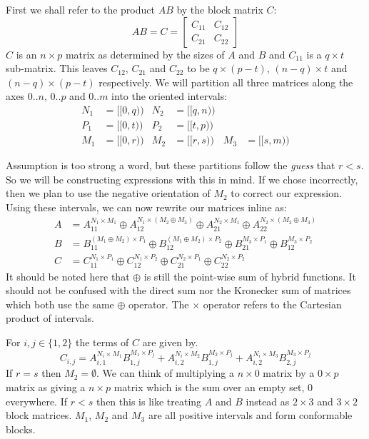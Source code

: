First we shall refer to the product $AB$ by the block matrix $C$:
\begin{equation}
	AB = C = \begin{bmatrix} C_{11} & C_{12} \\ C_{21} & C_{22} \end{bmatrix}
\end{equation}
$C$ is an $n \times p$ matrix as determined by the sizes of $A$ and $B$ and $C_{11}$ is a $q \times t$ sub-matrix.
This leaves $C_{12}$, $C_{21}$ and $C_{22}$ to be $q \times (p-t)$, $(n-q) \times t$ and $(n-q) \times (p-t)$ respectively.
We will partition all three matrices along the axes $0.. n$, $0..p$ and $0..m$ into the oriented intervals:
\begin{align*}
	N_1 	&= [\![0, q)\!) 	& N_2 	&= [\![q, n)\!) 	\\
	P_1 	&= [\![0, t)\!) 	& P_2 	&= [\![t, p)\!) 	\\
	M_1 	&= [\![0, r)\!) 	& M_2 	&= [\![r, s)\!) 	& M_3 	&= [\![s, m)\!)
\end{align*}


Assumption is too strong a word, but these partitions follow the \emph{guess} that $r<s$.
So we will be constructing expressions with this in mind. 
If we chose incorrectly, then we plan to use the negative orientation of $M_2$ to correct our expression.
Using these intervals, we can now rewrite our matrices inline as:
\begin{align}
	A & =	A_{11}^{N_1 \times M_1} \oplus A_{12}^{N_1 \times (M_2 \oplus M_3)} \oplus 
			A_{21}^{N_2 \times M_1} \oplus A_{22}^{N_2 \times (M_2 \oplus M_3)} \\
	B & =	B_{11}^{(M_1 \oplus M_2) \times P_1} \oplus B_{12}^{(M_1 \oplus M_2) \times P_2} \oplus 
			B_{21}^{M_3 \times P_1} \oplus B_{12}^{M_3 \times P_2}\\
	C & =	C_{11}^{N_1 \times P_1} \oplus C_{12}^{N_1 \times P_2} \oplus
			C_{21}^{N_2 \times P_1} \oplus C_{22}^{N_2 \times P_2}
\end{align}
It should be noted here that $\oplus$ is still the point-wise sum of hybrid functions.
It should not be confused with the direct sum nor the Kronecker sum of matrices which both use the same $\oplus$ operator.
The $\times$ operator refers to the Cartesian product of intervals. 


For $i,j \in \{ 1,2 \}$ the terms of $C$ are given by.
\begin{equation}
	C_{i,j} 	= A_{i,1}^{N_i \times M_1} B_{1,j}^{M_1 \times P_j} 
			+ A_{i,2}^{N_i \times M_2} B_{1,j}^{M_2 \times P_j}
			+ A_{i,2}^{N_i \times M_3} B_{2,j}^{M_3 \times P_j}
\end{equation}
If $r=s$ then $M_2 = \emptyset$.
We can think of multiplying a $n \times 0$ matrix by a $0 \times p$ matrix as giving a $n \times p$ matrix which is the sum
over an empty set, 0 everywhere.
If $r < s$ then this is like treating $A$ and $B$ instead as $2 \times 3$ and $3 \times 2$ block matrices.
$M_1$, $M_2$ and $M_3$ are all positive intervals and form conformable blocks.

